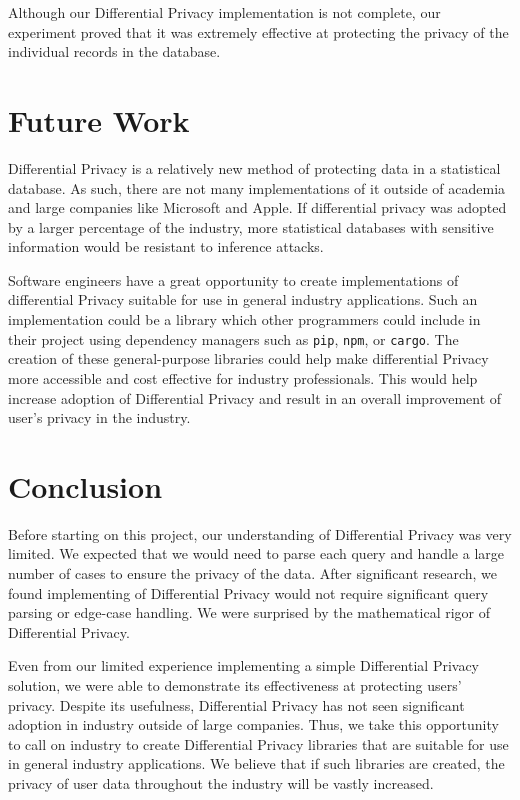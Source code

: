 \documentclass[conference,11pt]{IEEEtran}
\begin{document}
Although our Differential Privacy implementation is not complete, our experiment
proved that it was extremely effective at protecting the privacy of the
individual records in the database.

\section{Future Work}\label{sec:future-work}
Differential Privacy is a relatively new method of protecting data in a
statistical database. As such, there are not many implementations of it outside
of academia and large companies like Microsoft and Apple. If differential
privacy was adopted by a larger percentage of the industry, more statistical
databases with sensitive information would be resistant to inference attacks.

Software engineers have a great opportunity to create implementations of
differential Privacy suitable for use in general industry applications. Such an
implementation could be a library which other programmers could include in their
project using dependency managers such as \texttt{pip}, \texttt{npm}, or
\texttt{cargo}. The creation of these general-purpose libraries could help make
differential Privacy more accessible and cost effective for industry
professionals. This would help increase adoption of Differential Privacy and
result in an overall improvement of user's privacy in the industry.

\section{Conclusion}\label{sec:conclusion}
Before starting on this project, our understanding of Differential Privacy was
very limited. We expected that we would need to parse each query and handle a
large number of cases to ensure the privacy of the data.  After significant
research, we found implementing of Differential Privacy would not require
significant query parsing or edge-case handling. We were surprised by the
mathematical rigor of Differential Privacy.

Even from our limited experience implementing a simple Differential Privacy
solution, we were able to demonstrate its effectiveness at protecting users'
privacy. Despite its usefulness, Differential Privacy has not seen significant
adoption in industry outside of large companies. Thus, we take this opportunity
to call on industry to create Differential Privacy libraries that are suitable
for use in general industry applications. We believe that if such libraries are
created, the privacy of user data throughout the industry will be vastly
increased.

{\printbibliography}
\end{document}
